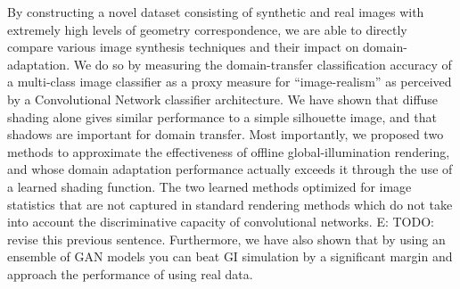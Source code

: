 \documentclass[10pt,twocolumn,letterpaper]{article}
\newcommand{\tompson}[1]{{\color{green} JT: #1}}
\newcommand{\edit}[1]{{\color{red} E: #1}}
\begin{document}
By constructing a novel dataset consisting of synthetic and real images with extremely high levels of geometry correspondence, we are able to directly compare various image synthesis techniques and their impact on domain-adaptation. We do so by measuring the domain-transfer classification accuracy of a multi-class image classifier as a proxy measure for ``image-realism'' as perceived by a Convolutional Network classifier architecture.  We have shown that diffuse shading alone gives similar performance to a simple silhouette image, and that shadows are important for domain transfer.  Most importantly, we proposed two methods to approximate the effectiveness of offline global-illumination rendering, and whose domain adaptation performance actually exceeds it through the use of a learned shading function. The two learned methods optimized for image statistics that are not captured in standard rendering methods which do not take into account the discriminative capacity of convolutional networks. \edit{TODO: revise this previous sentence.} Furthermore, we have also shown that by using an ensemble of GAN models you can beat GI simulation by a significant margin and approach the performance of using real data.

\end{document}
